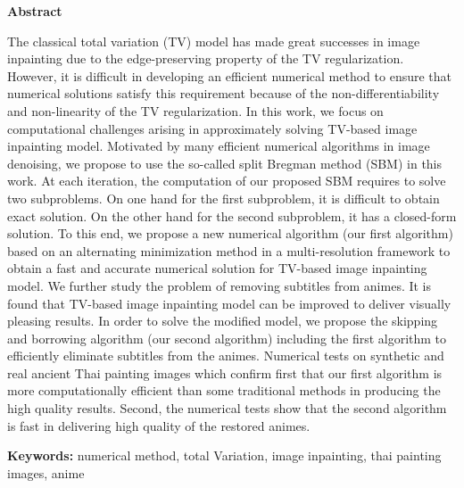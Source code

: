 \thispagestyle{empty}
\vspace{2 cm}
{\huge \bf Abstract}

\vspace{2 cm}

\hspace{1cm} The classical total variation (TV) model has made great successes in image inpainting due to the edge-preserving property of the TV regularization. However, it is difficult in developing an efficient numerical method to ensure that numerical solutions satisfy this requirement because of the non-differentiability and non-linearity of the TV regularization. In this work, we focus on computational challenges arising in approximately solving TV-based image inpainting model. Motivated by many efficient numerical algorithms in image denoising, we propose to use the so-called split Bregman method (SBM) in this work. At each iteration, the computation of our proposed SBM requires to solve two subproblems. On one hand for the first subproblem, it is difficult to obtain exact solution. On the other hand for the second subproblem, it has a closed-form solution. To this end, we propose a new numerical algorithm (our first algorithm) based on an alternating minimization method in a multi-resolution framework to obtain a fast and accurate numerical solution for TV-based image inpainting model. We further study the problem of removing subtitles from animes. It is found that TV-based image inpainting model can be improved to deliver visually pleasing results. In order to solve the modified model, we propose the skipping and borrowing algorithm (our second algorithm) including the first algorithm to efficiently eliminate subtitles from the animes. Numerical tests on synthetic and real ancient Thai painting images which confirm first that our first algorithm is more computationally efficient than some traditional methods in producing the high quality results. Second, the numerical tests show that the second algorithm is fast in delivering high quality of the restored animes.   

\vspace{1 cm}

{\bf{Keywords:}} numerical method, total Variation, image inpainting, thai painting images, anime \\
\newpage